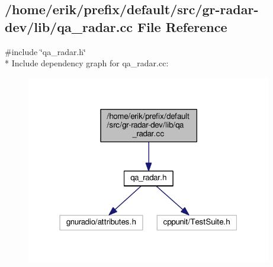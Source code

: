 \subsection{/home/erik/prefix/default/src/gr-\/radar-\/dev/lib/qa\+\_\+radar.cc File Reference}
\label{qa__radar_8cc}
{\ttfamily \#include \char`\"{}qa\+\_\+radar.\+h\char`\"{}}\\*
Include dependency graph for qa\+\_\+radar.\+cc\+:
\nopagebreak
\begin{figure}[H]
\begin{center}
\leavevmode
\includegraphics[width=304pt]{d8/d73/qa__radar_8cc__incl}
\end{center}
\end{figure}
